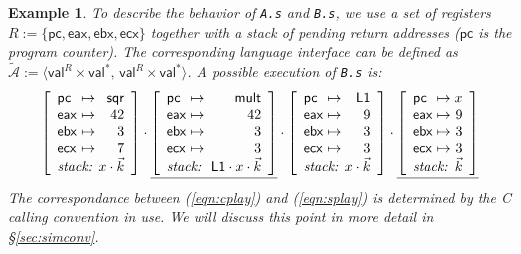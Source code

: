 \documentclass[draft,11pt]{report}
\newtheorem{example}{Example}
\newcommand{\kw}[1]{\ensuremath{ \mathsf{#1} }}
\newcommand{\figsize}{}
\begin{document}
\begin{example}
To describe the behavior of \texttt{A.s} and \texttt{B.s},
we use a set of registers
$R := \{ \kw{pc}, \kw{eax}, \kw{ebx}, \kw{ecx} \}$
together with a stack of pending return addresses
($\kw{pc}$ is the program counter).
The corresponding language interface can be defined as
$\tilde{\mathcal{A}} :=
 \langle \kw{val}^R \times \kw{val}^*, \,
         \kw{val}^R \times \kw{val}^* \rangle$.
A possible execution of \texttt{B.s}
is: %
\begin{equation} \label{eqn:splay}
{
  \figsize
  \left[
    \begin{array}{l@{{} \mapsto {}}r}
      \kw{pc}  & \kw{sqr} \\
      \kw{eax} & 42 \\
      \kw{ebx} & 3 \\
      \kw{ecx} & 7 \\
      \multicolumn{2}{c}{\textit{stack: } \hfill x \cdot \vec{k}}
    \end{array}
  \right] \cdot
  \underline{
    \left[
      \begin{array}{l@{{} \mapsto {}}r}
        \kw{pc}  & \kw{mult} \\
        \kw{eax} & 42 \\
        \kw{ebx} & 3 \\
        \kw{ecx} & 3 \\
        \multicolumn{2}{c}{\textit{stack: } \: \kw{L1} \cdot x \cdot \vec{k}}
      \end{array}
    \right]} \cdot
  \left[
    \begin{array}{l@{{} \mapsto {}}r}
      \kw{pc}  & \kw{L1} \\
      \kw{eax} & 9 \\
      \kw{ebx} & 3 \\
      \kw{ecx} & 3 \\
      \multicolumn{2}{c}{\textit{stack: } \hfill x \cdot \vec{k}}
    \end{array}
  \right] \cdot
  \underline{
    \left[
      \begin{array}{l@{{} \mapsto {}}r}
        \kw{pc}  & x \\
        \kw{eax} & 9 \\
        \kw{ebx} & 3 \\
        \kw{ecx} & 3 \\
        \multicolumn{2}{c}{\textit{stack: } \hfill \vec{k}}
      \end{array}
    \right]}
}
\end{equation}
The correspondance between (\ref{eqn:cplay}) and (\ref{eqn:splay})
is determined by the C calling convention in use.
We will discuss this point in more detail in \S\ref{sec:simconv}.
\end{example}
\end{document}
